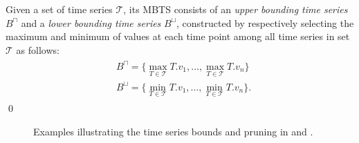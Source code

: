 \begin{mydefinition} 
Given a set of time series $\mathcal{T}$, its MBTS consists of an \emph{upper bounding time series} $B^{\sqcap}$ and a \emph{lower bounding time series} $B^{\sqcup}$, constructed by respectively selecting the maximum and minimum of values at each time point among all time series in set $\mathcal{T}$ as follows:
\begin{align}\label{eq:bounds}
 \begin{split}
  & B^{\sqcap} = \{ \max_{T \in \mathcal{T}} T.v_1, \ldots, \max_{T \in \mathcal{T}} T.v_{n} \} \\
  & B^{\sqcup} = \{ \min_{T \in \mathcal{T}} T.v_1, \ldots, \min_{T \in \mathcal{T}} T.v_{n} \}.
 \end{split}
\end{align}
\qed
\end{mydefinition}

\begin{figure}[!t]
 \centering
 \hspace{8pt}
 \hspace{8pt}
\caption{Examples illustrating the time series bounds and pruning in \tsr and \btsr.}
\label{fig:example_bounds}
\end{figure}

